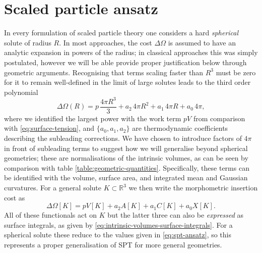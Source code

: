 \documentclass[11pt,twoside]{report}
\begin{document}
\section{Scaled particle ansatz}
\label{sec:morphometric-approach}

In every formulation of scaled particle theory one considers a hard \emph{spherical} solute of radius $R$.
In most approaches, the cost $\Delta \Omega$ is assumed to have an analytic expansion in powers of the radius; in classical approaches this was simply postulated, however we will be able provide proper justification below through geometric arguments.
Recognising that terms scaling faster than $R^3$ must be zero for it to remain well-defined in the limit of large solutes leads to the third order polynomial \cite{ReissJCP1959}
\begin{equation}\label{eq:spt-ansatz}
  \Delta\Omega(R) =
  p \, \frac{4\pi R^3}{3} + a_2 \, 4 \pi R^2 + a_1 \, 4 \pi R + a_0 \, 4 \pi,
\end{equation}
where we identified the largest power with the work term $pV$ from comparison with \eqref{eq:surface-tension}, and $\{a_0, a_1, a_2\}$ are thermodynamic coefficients describing the subleading corrections.
We have chosen to introduce factors of $4\pi$ in front of subleading terms to suggest how we will generalise beyond spherical geometries; these are normalisations of the intrinsic volumes, as can be seen by comparison with table \ref{table:geometric-quantities}.
Specifically, these terms can be identified with the volume, surface area, and integrated mean and Gaussian curvatures.
For a general solute $K \subset \mathbb{R}^3$ we then write the morphometric insertion cost as%
\begin{equation}\label{eq:morph-ansatz}
  \Delta\Omega[K] =
  p V[K]
  + a_2 A[K]
  + a_1 C[K]
  + a_0 X[K].
\end{equation}
All of these functionals act on $K$ but the latter three can also be \emph{expressed} as surface integrals, as given by \eqref{eq:intrinsic-volumes-surface-integrals}.
For a spherical solute these reduce to the values given in \eqref{eq:spt-ansatz}, so this represents a proper generalisation of SPT for more general geometries.
\end{document}
